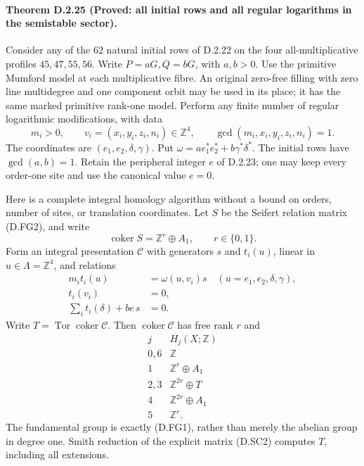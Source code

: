 \paragraph{Theorem D.2.25 (Proved: all initial rows and all regular logarithms in the semistable sector).}
Consider any of the $62$ natural initial rows of D.2.22 on the four
all-multiplicative profiles $45,47,55,56$. Write $P=aG,Q=bG$, with
$a,b>0$. Use the primitive Mumford model at each multiplicative fibre.
An original zero-free filling with zero line multidegree and one
component orbit may be used in its place; it has the same marked
primitive rank-one model. Perform any finite number of regular
logarithmic modifications, with data
\[
 m_i>0,\qquad v_i=(x_i,y_i,z_i,n_i)\in\mathbb Z^4,
 \qquad\gcd(m_i,x_i,y_i,z_i,n_i)=1.                           \tag{D.SC1}
\]
The coordinates are $(e_1,e_2,\delta,\gamma)$. Put
$\omega=a e_1^*e_2^*+b\gamma^*\delta^*$. The initial rows have
$\gcd(a,b)=1$. Retain the peripheral integer $e$ of D.2.23;
one may keep every order-one site and use the canonical value $e=0$.

Here is a complete integral homology algorithm without a bound on
orders, number of sites, or translation coordinates. Let $S$ be the
Seifert relation matrix (D.FG2), and write
\[
 \operatorname{coker}S=\mathbb Z^r\oplus A_1,\qquad r\in\{0,1\}.
\]
Form an integral presentation $\mathcal C$ with generators
$s$ and $t_i(u)$, linear in $u\in\Lambda=\mathbb Z^4$, and relations
\[
 \begin{split}
 m_i t_i(u)&=\omega(u,v_i)s\quad(u=e_1,e_2,\delta,\gamma),\\
 t_i(v_i)&=0,\\
 \sum_i t_i(\delta)+be\,s&=0.
 \end{split}                                                \tag{D.SC2}
\]
Write $T=\operatorname{Tor}\operatorname{coker}\mathcal C$.
Then $\operatorname{coker}\mathcal C$ has free rank $r$ and
\[
\begin{array}{c|c}
 j&H_j(X;\mathbb Z)\\\hline
 0,6&\mathbb Z\\
 1&\mathbb Z^r\oplus A_1\\
 2,3&\mathbb Z^{2r}\oplus T\\
 4&\mathbb Z^{2r}\oplus A_1\\
 5&\mathbb Z^r.
\end{array}                                                 \tag{D.SC3}
\]
The fundamental group is exactly (D.FG1), rather than merely the
abelian group in degree one. Smith reduction of the explicit matrix
(D.SC2) computes $T$, including all extensions.

